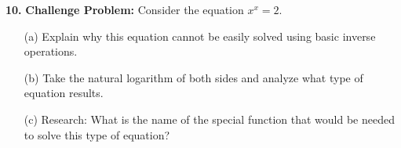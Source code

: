\documentclass[12pt]{article}
\begin{document}
\textbf{10.} \textbf{Challenge Problem:} Consider the equation $x^x = 2$. 

\begin{enumerate}
\item[(a)] Explain why this equation cannot be easily solved using basic inverse operations.
\vspace{3cm}

\item[(b)] Take the natural logarithm of both sides and analyze what type of equation results.
\vspace{3cm}

\item[(c)] Research: What is the name of the special function that would be needed to solve this type of equation?
\vspace{3cm}
\end{enumerate}
\end{document}
